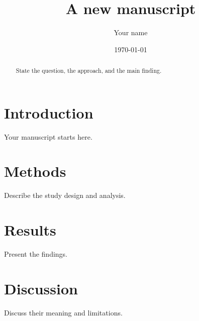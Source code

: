 \documentclass[11pt]{article}
\title{A new manuscript}
\author{Your name}
\date{\today}
\begin{document}
\maketitle
\begin{abstract}
State the question, the approach, and the main finding.
\end{abstract}
\section{Introduction}
Your manuscript starts here.
\section{Methods}
Describe the study design and analysis.
\section{Results}
Present the findings.
\section{Discussion}
Discuss their meaning and limitations.
% 
% 
\end{document}
